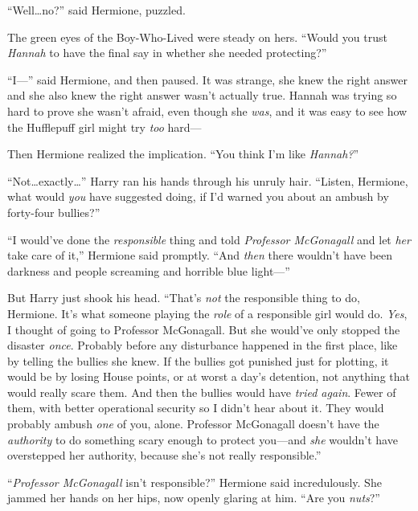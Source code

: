 “Well…no?” said Hermione, puzzled.

The green eyes of the Boy-Who-Lived were steady on hers.
“Would you trust \emph{Hannah} to have the final say in whether she needed protecting?”

“I—” said Hermione, and then paused. It was strange, she knew the right answer and she also knew the right answer wasn’t actually true. Hannah was trying so hard to prove she wasn’t afraid, even though she \emph{was}, and it was easy to see how the Hufflepuff girl might try \emph{too} hard—

Then Hermione realized the implication.
“You think I’m like \emph{Hannah?}”

“Not…exactly…” Harry ran his hands through his unruly hair.
“Listen, Hermione, what would \emph{you} have suggested doing, if I’d warned you about an ambush by forty-four bullies?”

“I would’ve done the \emph{responsible} thing and told \emph{Professor McGonagall} and let \emph{her} take care of it,” Hermione said promptly.
“And \emph{then} there wouldn’t have been darkness and people screaming and horrible blue light—”

But Harry just shook his head.
“That’s \emph{not} the responsible thing to do, Hermione. It’s what someone playing the \emph{role} of a responsible girl would do. \emph{Yes}, I thought of going to Professor McGonagall. But she would’ve only stopped the disaster \emph{once}. Probably before any disturbance happened in the first place, like by telling the bullies she knew. If the bullies got punished just for plotting, it would be by losing House points, or at worst a day’s detention, not anything that would really scare them. And then the bullies would have \emph{tried again}. Fewer of them, with better operational security so I didn’t hear about it. They would probably ambush \emph{one} of you, alone. Professor McGonagall doesn’t have the \emph{authority} to do something scary enough to protect you—and \emph{she} wouldn’t have overstepped her authority, because she’s not really responsible.”

“\emph{Professor McGonagall} isn’t responsible?” Hermione said incredulously. She jammed her hands on her hips, now openly glaring at him.
“Are you \emph{nuts}?”

